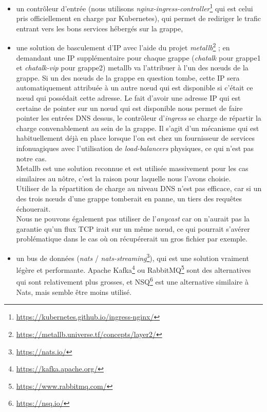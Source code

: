 \begin{itemize}
\item
  un contrôleur d'entrée (nous utilisons
  \textit{nginx-ingress-controller}\footnote{
    \url{https://kubernetes.github.io/ingress-nginx/}}
  qui est celui pris officiellement en charge par Kubernetes), qui
  permet de rediriger le trafic entrant vers les bons services hébergés
  sur la grappe,
\item
  une solution de basculement d'IP avec l'aide du projet
  \textit{metallb}\footnote{
    \url{https://metallb.universe.tf/concepts/layer2/}}
  ; en demandant une IP supplémentaire pour chaque grappe
  (\textit{chatalk} pour grappe1 et \textit{chatalk-vip} pour grappe2)
  metallb va l'attribuer à l'un des nœuds de la grappe. Si un des nœuds de la
  grappe en question tombe, cette IP sera automatiquement attribuée à
  un autre nœud qui est disponible si c'était ce nœud qui possédait
  cette adresse. Le fait d'avoir une adresse IP qui est certaine de
  pointer sur un nœud qui est disponible nous permet de faire pointer
  les entrées DNS dessus, le contrôleur d'\textit{ingress} se charge de
  répartir la charge convenablement au sein de la grappe. Il s'agit d'un
  mécanisme qui est habituellement déjà en place lorsque l'on est chez
  un fournisseur de services infonuagiques avec l'utilisation de
  \textit{load-balancers} physiques, ce qui n'est pas notre cas.\\
  Metallb est une solution reconnue et est utilisée massivement pour les
  cas similaires au nôtre, c'est la raison pour laquelle nous l'avons
  choisie.\\
  Utiliser de la répartition de charge au niveau DNS n'est pas efficace,
  car si un des trois nœuds d'une grappe tomberait en panne, un tiers
  des requêtes échouerait.\\
  Nous ne pouvons également pas utiliser de l'\textit{anycast} car on
  n'aurait pas la garantie qu'un flux TCP irait sur un même nœud, ce qui
  pourrait s'avérer problématique dans le cas où on récupérerait un gros
  fichier par exemple.
\item
  un bus de données (\textit{nats} /
  \textit{nats-streaming}\footnote{\url{https://nats.io/}}), qui est une
  solution vraiment légère et performante. Apache
  Kafka\footnote{\url{https://kafka.apache.org/}} ou
  RabbitMQ\footnote{\url{https://www.rabbitmq.com/}}
  sont des alternatives qui sont relativement plus grosses, et
  NSQ\footnote{\url{https://nsq.io/}} est une alternative
  similaire à Nats, mais semble être moins utilisé.\\

\end{itemize}
